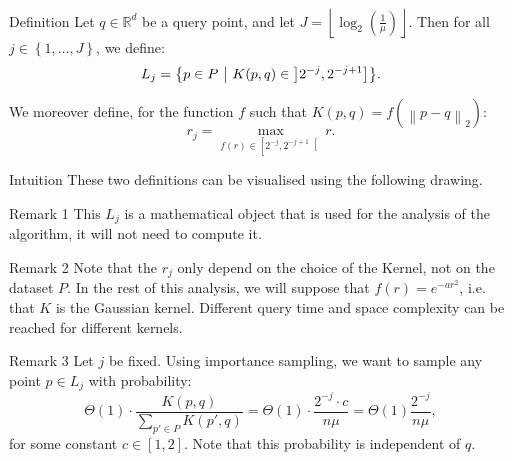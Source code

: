 \documentclass[a4paper]{article}
\begin{document}
\begin{parag}{Definition}
    Let $q \in \mathbb{R}^d$ be a query point, and let $J = \left\lfloor \log_2\left(\frac{1}{\mu}\right) \right\rfloor $. Then for all $j \in \left\{1, \ldots, J\right\}$, we define: 
    \[L_j = \left\{p \in P \suchthat K\left(p, q\right) \in \left]2^{-j}, 2^{-j+1}\right] \right\}.\]

    We moreover define, for the function $f$ such that $K\left(p, q\right) = f\left(\left\|p - q\right\|_2\right)$: 
    \[r_j = \max_{f\left(r\right) \in \left[2^{-j}, 2^{-j+1}\right[ } r.\]
    
    \begin{subparag}{Intuition}
        These two definitions can be visualised using the following drawing.
    \end{subparag}

    \begin{subparag}{Remark 1}
        This $L_j$ is a mathematical object that is used for the analysis of the algorithm, it will not need to compute it.
    \end{subparag}

    \begin{subparag}{Remark 2}
        Note that the $r_j$ only depend on the choice of the Kernel, not on the dataset $P$. In the rest of this analysis, we will suppose that $f\left(r\right) = e^{-a r^2}$, i.e. that $K$ is the Gaussian kernel. Different query time and space complexity can be reached for different kernels.
    \end{subparag}

    \begin{subparag}{Remark 3}
        Let $j$ be fixed. Using importance sampling, we want to sample any point $p \in L_j$ with probability:
        \[\Theta\left(1\right) \cdot \frac{K\left(p, q\right)}{\sum_{p' \in P} K\left(p', q\right)} = \Theta\left(1\right)\cdot \frac{2^{-j} \cdot c}{n \mu} = \Theta\left(1\right)  \frac{2^{-j}}{n \mu},\]
        for some constant $c \in \left[1, 2\right]$. Note that this probability is independent of $q$.
    \end{subparag}
\end{parag}
\end{document}
